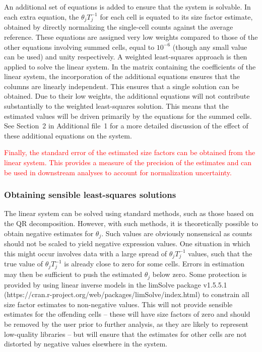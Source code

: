 \documentclass{bmcart}
\newcommand{\supplineardep}{2}
\newcommand{\revised}[1]{\textcolor{red}{#1}}
\begin{document}
An additional set of equations is added to ensure that the system is solvable.
In each extra equation, the $\theta_jT_j^{-1}$ for each cell is equated to its size factor estimate, obtained by directly normalizing the single-cell counts against the average reference.
These equations are assigned very low weights compared to those of the other equations involving summed cells, equal to $10^{-6}$ (though any small value can be used) and unity respectively.
A weighted least-squares approach is then applied to solve the linear system.
In the matrix containing the coefficients of the linear system, the incorporation of the additional equations ensures that the columns are linearly independent.
This ensures that a single solution can be obtained.
Due to their low weights, the additional equations will not contribute substantially to the weighted least-squares solution.
This means that the estimated values will be driven primarily by the equations for the summed cells.
See Section~\supplineardep{} in Additional file~1 for a more detailed discussion of the effect of these additional equations on the system.


\revised{Finally, the standard error of the estimated size factors can be obtained from the linear system.
This provides a measure of the precision of the estimates and can be used in downstream analyses to account for normalization uncertainty.
}

\subsubsection*{Obtaining sensible least-squares solutions}
The linear system can be solved using standard methods, such as those based on the QR decomposition.
However, with such methods, it is theoretically possible to obtain negative estimates for $\theta_j$.
Such values are obviously nonsensical as counts should not be scaled to yield negative expression values.
One situation in which this might occur involves data with a large spread of $\theta_jT_j^{-1}$ values, 
    such that the true value of $\theta_jT_j^{-1}$ is already close to zero for some cells.
Errors in estimation may then be sufficient to push the estimated $\theta_j$ below zero.
Some protection is provided by using linear inverse models in the limSolve package v1.5.5.1 ({https://cran.r-project.org/web/packages/limSolve/index.html}) \cite{soetaert2009limsolve} to constrain all size factor estimates to non-negative values.
This will not provide sensible estimates for the offending cells 
    -- these will have size factors of zero and should be removed by the user prior to further analysis, as they are likely to represent low-quality libraries 
    -- but will ensure that the estimates for other cells are not distorted by negative values elsewhere in the system.
\end{document}

